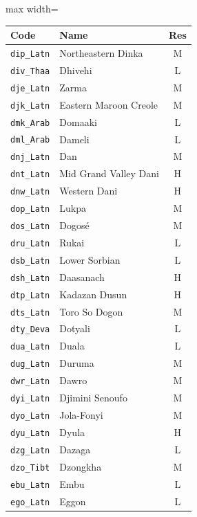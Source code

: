 {
    \tiny\renewcommand{\arraystretch}{.8}
    \begin{adjustbox}{max width=\textwidth}
    \begin{tabular}{llc}
        \toprule
        \textbf{Code} & \textbf{Name} & \textbf{Res}\\
        \midrule
        \texttt{dip\_Latn} & Northeastern Dinka & M \\
        \texttt{div\_Thaa} & Dhivehi & L \\
        \texttt{dje\_Latn} & Zarma & M \\
        \texttt{djk\_Latn} & Eastern Maroon Creole & M \\
        \texttt{dmk\_Arab} & Domaaki & L \\
        \texttt{dml\_Arab} & Dameli & L \\
        \texttt{dnj\_Latn} & Dan & M \\
        \texttt{dnt\_Latn} & Mid Grand Valley Dani & H \\
        \texttt{dnw\_Latn} & Western Dani & H \\
        \texttt{dop\_Latn} & Lukpa & M \\
        \texttt{dos\_Latn} & Dogosé & M \\
        \texttt{dru\_Latn} & Rukai & L \\
        \texttt{dsb\_Latn} & Lower Sorbian & L \\
        \texttt{dsh\_Latn} & Daasanach & H \\
        \texttt{dtp\_Latn} & Kadazan Dusun & H \\
        \texttt{dts\_Latn} & Toro So Dogon & M \\
        \texttt{dty\_Deva} & Dotyali & L \\
        \texttt{dua\_Latn} & Duala & L \\
        \texttt{dug\_Latn} & Duruma & M \\
        \texttt{dwr\_Latn} & Dawro & M \\
        \texttt{dyi\_Latn} & Djimini Senoufo & M \\
        \texttt{dyo\_Latn} & Jola-Fonyi & M \\
        \texttt{dyu\_Latn} & Dyula & H \\
        \texttt{dzg\_Latn} & Dazaga & L \\
        \texttt{dzo\_Tibt} & Dzongkha & M \\
        \texttt{ebu\_Latn} & Embu & L \\
        \texttt{ego\_Latn} & Eggon & L \\

\end{tabular}
\end{adjustbox}}
